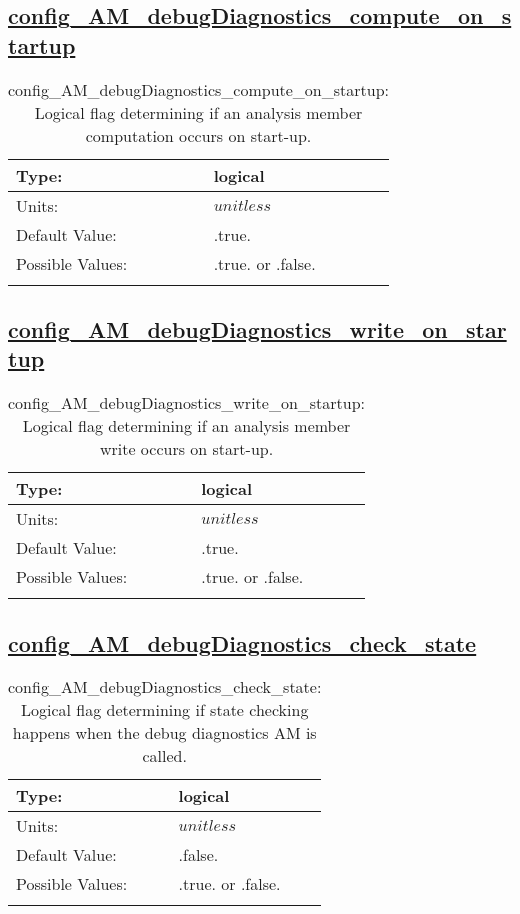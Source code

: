 \subsection[config\_AM\_debugDiagnostics\_compute\_on\_startup]{\hyperref[sec:nm_tab_AM_debugDiagnostics]{config\_AM\_debugDiagnostics\_compute\_on\_startup}}
\label{subsec:nm_sec_config_AM_debugDiagnostics_compute_on_startup}
\begin{center}
\begin{longtable}{| p{2.0in} || p{4.0in} |}
    \hline
    Type: & logical \\
    \hline
    Units: & $unitless$ \\
    \hline
    Default Value: & .true. \\
    \hline
    Possible Values: & .true. or .false. \\
    \hline
    \caption{config\_AM\_debugDiagnostics\_compute\_on\_startup: Logical flag determining if an analysis member computation occurs on start-up.}
\end{longtable}
\end{center}
\subsection[config\_AM\_debugDiagnostics\_write\_on\_startup]{\hyperref[sec:nm_tab_AM_debugDiagnostics]{config\_AM\_debugDiagnostics\_write\_on\_startup}}
\label{subsec:nm_sec_config_AM_debugDiagnostics_write_on_startup}
\begin{center}
\begin{longtable}{| p{2.0in} || p{4.0in} |}
    \hline
    Type: & logical \\
    \hline
    Units: & $unitless$ \\
    \hline
    Default Value: & .true. \\
    \hline
    Possible Values: & .true. or .false. \\
    \hline
    \caption{config\_AM\_debugDiagnostics\_write\_on\_startup: Logical flag determining if an analysis member write occurs on start-up.}
\end{longtable}
\end{center}
\subsection[config\_AM\_debugDiagnostics\_check\_state]{\hyperref[sec:nm_tab_AM_debugDiagnostics]{config\_AM\_debugDiagnostics\_check\_state}}
\label{subsec:nm_sec_config_AM_debugDiagnostics_check_state}
\begin{center}
\begin{longtable}{| p{2.0in} || p{4.0in} |}
    \hline
    Type: & logical \\
    \hline
    Units: & $unitless$ \\
    \hline
    Default Value: & .false. \\
    \hline
    Possible Values: & .true. or .false. \\
    \hline
    \caption{config\_AM\_debugDiagnostics\_check\_state: Logical flag determining if state checking happens when the debug diagnostics AM is called.}
\end{longtable}
\end{center}
